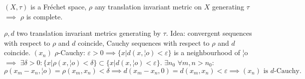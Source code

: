 \documentclass[12pt]{article}					%
\begin{document}
%
%
%
%

\begin{tvrzeni}
	$(X, τ)$ is a Fréchet space, $ρ$ any translation invariant metric on $X$ generating $τ$ $\implies$ $ρ$ is complete.

	\begin{dukazin}
		$ρ, d$ two translation invariant metrics generating by $τ$. Idea: convergent sequences with respect to $ρ$ and $d$ coincide, Cauchy sequences with respect to $ρ$ and $d$ coincide. $(x_n)$ $ρ$-Cauchy: $ε > 0 \implies \{x | d(x, ¦o) < ε\}$ is a neighbourhood of ¦o $\implies$ $\exists δ > 0: \{x | ρ(x, ¦o) < δ\} \subset \{x | d(x, ¦o) < ε\}$. $\exists n_0$ $\forall m, n > n_0$:
		$$ ρ(x_m - x_n, ¦o) = ρ(x_m, x_n) < δ \implies d(x_m - x_n, 0) = d(x_m, x_n) < ε \implies (x_n) \text{ is $d$-Cauchy.} $$
	\end{dukazin}
\end{tvrzeni}
\end{document}
